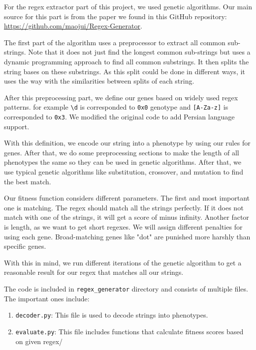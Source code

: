 \documentclass{solutionclass} %
\begin{document}
\begin{solution}
For the regex extractor part of this project, we used genetic algorithms. Our main source for this part is from the paper we found in this GitHub repository: \url{https://github.com/maojui/Regex-Generator}.

The first part of the algorithm uses a preprocessor to extract all common sub-strings. Note that it does not just find the longest common sub-strings but uses a dynamic programming approach to find all common substrings. It then splits the string bases on these substrings. As this split could be done in different ways, it uses the way with the similarities between splits of each string.

After this preprocessing part, we define our genes based on widely used regex patterns. for example \verb*|\d| is corresponded to \verb*|0x0| genotype and \verb*|[A-Za-z]| is corresponded to \verb*|0x3|.  We modified the original code to add Persian language support.

With this definition, we encode our string into a phenotype by using our rules for genes. After that, we do some preprocessing sections to make the length of all phenotypes the same so they can be used in genetic algorithms. After that, we use typical genetic algorithms like substitution, crossover, and mutation to find the best match.

Our fitness function considers different parameters. The first and most important one is matching. The regex should match all the strings perfectly. If it does not match with one of the strings, it will get a score of minus infinity. Another factor is length, as we want to get short regexes. We will assign different penalties for using each gene. Broad-matching genes like "dot" are punished more harshly than specific genes.

With this in mind, we run different iterations of the genetic algorithm to get a reasonable result for our regex that matches all our strings.

The code is included in \verb*|regex_generator| directory and consists of multiple files. The important ones include:

\begin{enumerate}
\item \verb*|decoder.py|: This file is used to decode strings into phenotypes.

\item \verb*|evaluate.py|: This file includes functions that calculate fitness scores based on given regex/


\end{enumerate}
\end{solution}
\end{document}
